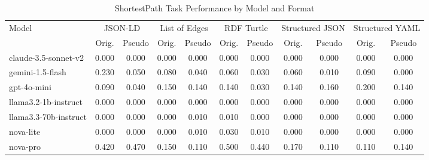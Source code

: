 \begin{table}[ht]
\centering
\caption{ShortestPath Task Performance by Model and Format}
\begin{tabular}{lcccccccccc}
\toprule
\multirow{2}{*}{Model} & \multicolumn{2}{c}{JSON-LD} & \multicolumn{2}{c}{List of Edges} & \multicolumn{2}{c}{RDF Turtle} & \multicolumn{2}{c}{Structured JSON} & \multicolumn{2}{c}{Structured YAML} \\
 & Orig. & Pseudo & Orig. & Pseudo & Orig. & Pseudo & Orig. & Pseudo & Orig. & Pseudo \\
\midrule
claude-3.5-sonnet-v2 & 0.000 & 0.000 & 0.000 & 0.000 & 0.000 & 0.000 & 0.000 & 0.000 & 0.000 & 0.000 \\
gemini-1.5-flash & 0.230 & 0.050 & 0.080 & 0.040 & 0.060 & 0.030 & 0.060 & 0.010 & 0.090 & 0.000 \\
gpt-4o-mini & 0.090 & 0.040 & 0.150 & 0.140 & 0.140 & 0.030 & 0.140 & 0.160 & 0.200 & 0.140 \\
llama3.2-1b-instruct & 0.000 & 0.000 & 0.000 & 0.000 & 0.000 & 0.000 & 0.000 & 0.000 & 0.000 & 0.000 \\
llama3.3-70b-instruct & 0.000 & 0.000 & 0.000 & 0.010 & 0.010 & 0.000 & 0.000 & 0.000 & 0.000 & 0.000 \\
nova-lite & 0.000 & 0.000 & 0.000 & 0.010 & 0.030 & 0.010 & 0.000 & 0.000 & 0.000 & 0.000 \\
nova-pro & 0.420 & 0.470 & 0.150 & 0.110 & 0.500 & 0.440 & 0.170 & 0.110 & 0.110 & 0.140 \\
\bottomrule
\end{tabular}
\end{table}